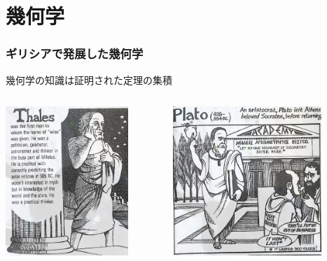 \documentclass[unicode, 14pt, aspectratio=169]{beamer}
\begin{document}
\section{幾何学}
\begin{frame}
  \frametitle{ギリシアで発展した幾何学}
  {\large 幾何学の知識は証明された定理の集積}
\begin{columns}
  \begin{column}{0.25\textwidth}  %
    \begin{center}
      \includegraphics[width=0.8\textwidth]{images/thales.png}
    \end{center}
  \end{column}
  \begin{column}{0.25\textwidth}  %
    \begin{center}
      \includegraphics[width=0.8\textwidth]{images/plato.png}

\end{center}
\end{column}
\end{columns}
\end{frame}
\end{document}
